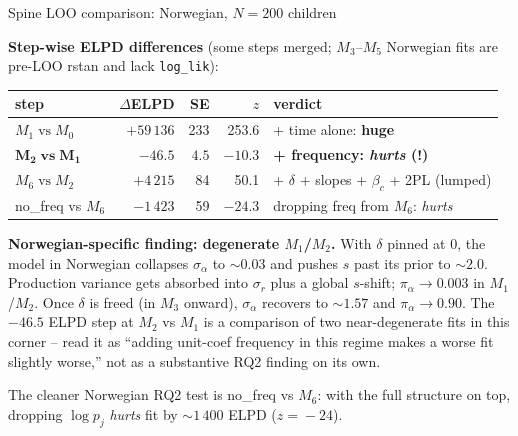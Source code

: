 \documentclass[aspectratio=169,t]{beamer}
\renewcommand{\arraystretch}{1.05}
\begin{document}
\begin{frame}{Spine LOO comparison: Norwegian, $N\!=\!200$ children}

\vspace{0.4em}
\textbf{Step-wise ELPD differences} (some steps merged; $M_3$--$M_5$ Norwegian fits
are pre-LOO rstan and lack \texttt{log\_lik}):

\vspace{0.4em}
\centering
\small
\renewcommand{\arraystretch}{1.18}
\begin{tabular}{@{}lrrrl@{}}
\toprule
step & $\Delta$ELPD & SE & $z$ & verdict \\
\midrule
$M_1\;\text{vs}\;M_0$ & $+59\,136$ & 233  & 253.6 & + time alone: \textbf{huge} \\
$\boldsymbol{M_2\;\text{vs}\;M_1}$ & $\boldsymbol{-46.5}$ & $\boldsymbol{4.5}$ & $\boldsymbol{-10.3}$ &
  \textbf{+ frequency: \emph{hurts} (!)} \\
$M_6\;\text{vs}\;M_2$ & $+4\,215$ & 84  & 50.1  & + $\delta$ + slopes + $\beta_c$ + 2PL (lumped) \\
no\_freq vs $M_6$    & $-1\,423$ & 59 & $-24.3$ & dropping freq from $M_6$: \emph{hurts} \\
\bottomrule
\end{tabular}

\vspace{0.6em}
\flushleft
\footnotesize
\textbf{Norwegian-specific finding: degenerate $M_1$/$M_2$.} With $\delta$ pinned
at 0, the model in Norwegian collapses $\sigma_\alpha$ to $\sim\!0.03$ and pushes
$s$ past its prior to $\sim\!2.0$. Production variance gets absorbed into $\sigma_r$
plus a global $s$-shift; $\pi_\alpha\!\to\!0.003$ in $M_1$/$M_2$. Once $\delta$ is
freed (in $M_3$ onward), $\sigma_\alpha$ recovers to $\sim\!1.57$ and
$\pi_\alpha\!\to\!0.90$. The $-46.5$ ELPD step at $M_2$ vs $M_1$ is a comparison
of two near-degenerate fits in this corner -- read it as ``adding unit-coef
frequency in this regime makes a worse fit slightly worse,'' not as a
substantive RQ2 finding on its own.

\vspace{0.3em}
The cleaner Norwegian RQ2 test is no\_freq vs $M_6$: with the full structure on
top, dropping $\log p_j$ \emph{hurts} fit by $\sim\!1\,400$ ELPD ($z\!=\!-24$).

\end{frame}
\end{document}
